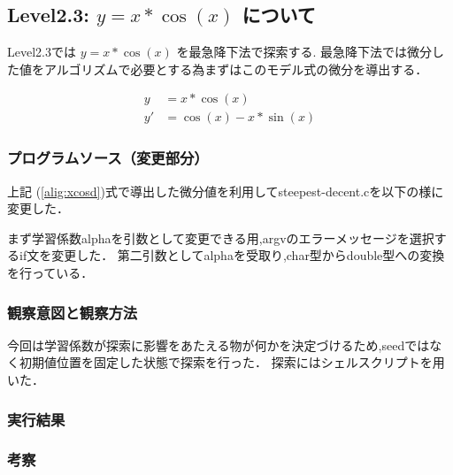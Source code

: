 \subsection{Level2.3: $y=x*\cos(x)$ について}
Level2.3では $y=x*\cos(x)$ を最急降下法で探索する.
最急降下法では微分した値をアルゴリズムで必要とする為まずはこのモデル式の微分を導出する．

\begin{align}
    y &= x * \cos(x) \label{alig:cos}\\
    y' &= \cos(x) - x * \sin(x)
    \label{alig:xcosd}
\end{align}


\subsubsection{プログラムソース（変更部分）}

上記 (\ref{alig:xcosd})式で導出した微分値を利用してsteepest-decent.cを以下の様に変更した．

まず学習係数alphaを引数として変更できる用,argvのエラーメッセージを選択するif文を変更した．
第二引数としてalphaを受取り,char型からdouble型への変換を行っている．


\subsubsection{観察意図と観察方法}
今回は学習係数が探索に影響をあたえる物が何かを決定づけるため,seedではなく初期値位置を固定した状態で探索を行った．
探索にはシェルスクリプトを用いた．

\subsubsection{実行結果}
\subsubsection{考察}

